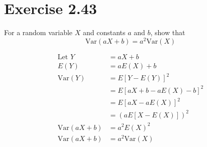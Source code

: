 \documentclass{article}
\newcommand{\var}{\text{Var}}
\begin{document}
\section*{Exercise 2.43}
	For a random variable $X$ and constants $a$ and $b$, show that
	\[ \var(aX + b) = a^2 \var(X) \]
	
	\begin{align*}
		\text{Let } Y &= aX+b\\
		E(Y) &= aE(X) + b\\
		\var(Y) &= E\left[ Y - E(Y) \right]^2\\
		&= E \left[ aX + b - aE(X) - b \right]^2\\
		&= E \left[ aX - aE(X) \right]^2\\
		&= \left( aE \left[ X - E(X) \right] \right) ^2 \\
		\var(aX+b) &= a^2 E(X)^2\\
		\var(aX+b) &= a^2 \var(X)\\
	\end{align*}
\end{document}
